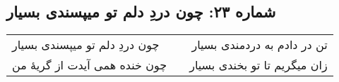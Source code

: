 \begin{center}
\section*{شماره ۲۳: چون دردِ دلم تو میپسندی بسیار}
\label{sec:023}
\begin{longtable}{l p{0.5cm} r}
چون دردِ دلم تو میپسندی بسیار
&&
تن در دادم به دردمندی بسیار
\\
چون خنده همی آیدت از گریهٔ من
&&
زان میگریم تا تو بخندی بسیار
\\
\end{longtable}
\end{center}
